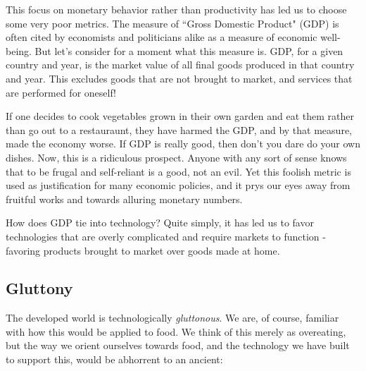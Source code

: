 \documentclass[letterpaper]{article}
\begin{document}
This focus on monetary behavior rather than productivity has led us to choose some very poor metrics. The measure of ``Gross Domestic Product" (GDP) is often cited by economists and politicians alike as a measure of economic well-being. But let's consider for a moment what this measure is. GDP, for a given country and year, is the market value of all final goods produced in that country and year. This excludes goods that are not brought to market, and services that are performed for oneself!

If one decides to cook vegetables grown in their own garden and eat them rather than go out to a restauraunt, they have harmed the GDP, and by that measure, made the economy worse. If GDP is really good, then don't you dare do your own dishes. Now, this is a ridiculous prospect. Anyone with any sort of sense knows that to be frugal and self-reliant is a good, not an evil. Yet this foolish metric is used as justification for many economic policies, and it prys our eyes away from fruitful works and towards alluring monetary numbers.

How does GDP tie into technology? Quite simply, it has led us to favor technologies that are overly complicated and require markets to function - favoring products brought to market over goods made at home.


\iffalse
\subsection{Gnosticism}

Seeing these disconnecting patterns, the other heresy has become apparent in our times as well: the \textit{gnostic} heresy: that material things are flawed, evil, or are in some sense inauthentic or a distraction. These heretics have been throroughly rebuked by such saints as Irenaeus.
\fi

\subsection{Gluttony}

The developed world is technologically \textit{gluttonous}. We are, of course, familiar with how this would be applied to food. We think of this merely as overeating, but the way we orient ourselves towards food, and the technology we have built to support this, would be abhorrent to an ancient:
\end{document}
